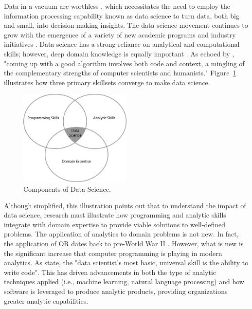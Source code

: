 \documentclass[twocolumn]{svjour3}       %
\begin{document}
Data in a vacuum are worthless \citep{gm15}, which necessitates the need to employ the information processing capability known as data science to turn data, both big and small, into decision-making insights. The data science movement continues to grow with the emergence of a variety of new academic programs and industry initiatives \citep{d15,ss15}. Data science has a strong reliance on analytical and computational skills; however, deep domain knowledge is equally important \citep{wf13}.  As echoed by \citet[p. 95]{smbdel15}, "coming up with a good algorithm involves both code and context, a mingling of the complementary strengths of computer scientists and humanists." Figure~\ref{fig:1} illustrates how three primary skillsets converge to make data science.

\begin{figure}[!htb]
  \includegraphics[width=0.5\textwidth]{venn-diagram.png}
  \caption{Components of Data Science.}
  \label{fig:1}
\end{figure}

Although simplified, this illustration points out that to understand the impact of data science, research must illustrate how programming and analytic skills integrate with domain expertise to provide viable solutions to well-defined problems. The application of analytics to domain problems is not new.  In fact, the application of OR dates back to pre-World War II \citep{l84}.  However, what is new is the significant increase that computer programming is playing in modern analytics.  As \citet[p. 74]{dp12} state, the "data scientist's most basic, universal skill is the ability to write code".  This has driven advancements in both the type of analytic techniques applied (i.e., machine learning, natural language processing) and how software is leveraged to produce analytic products, providing organizations greater analytic capabilities. 


\end{document}
